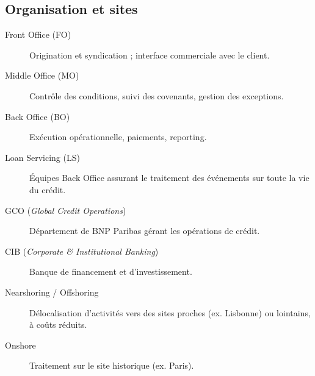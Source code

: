 \subsection*{Organisation et sites}
\begin{description}
  \item[Front Office (FO)] Origination et syndication ; interface commerciale avec le client.
  \item[Middle Office (MO)] Contrôle des conditions, suivi des covenants, gestion des exceptions.
  \item[Back Office (BO)] Exécution opérationnelle, paiements, reporting.
  \item[Loan Servicing (LS)] Équipes Back Office assurant le traitement des événements sur toute la vie du crédit.
  \item[GCO (\textit{Global Credit Operations})] Département de BNP Paribas gérant les opérations de crédit.
  \item[CIB (\textit{Corporate \& Institutional Banking})] Banque de financement et d'investissement.
  \item[Nearshoring / Offshoring] Délocalisation d'activités vers des sites proches (ex. Lisbonne) ou lointains, à coûts réduits.
  \item[Onshore] Traitement sur le site historique (ex. Paris).
\end{description}

